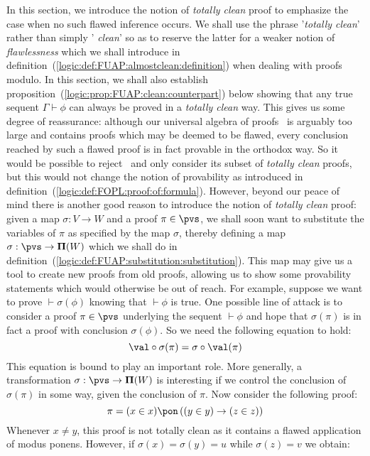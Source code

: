 In this section, we introduce the notion of {\em totally clean}
proof to emphasize the case when no such flawed inference occurs. We
shall use the phrase '{\em totally clean}' rather than simply '{\em
clean}' so as to reserve the latter for a weaker notion of {\em
flawlessness} which we shall introduce in
definition~(\ref{logic:def:FUAP:almostclean:definition}) when
dealing with proofs modulo. In this section, we shall also establish
proposition~(\ref{logic:prop:FUAP:clean:counterpart}) below showing
that any true sequent $\Gamma\vdash\phi$ can always be proved in a
{\em totally clean} way. This gives us some degree of reassurance:
although our universal algebra of proofs \pvs\ is arguably too large
and contains proofs which may be deemed to be flawed, every
conclusion reached by such a flawed proof is in fact provable in the
orthodox way. So it would be possible to reject \pvs\ and only
consider its subset of {\em totally clean} proofs, but this would
not change the notion of provability as introduced in
definition~(\ref{logic:def:FOPL:proof:of:formula}). However, beyond
our peace of mind there is another good reason to introduce the
notion of {\em totally clean} proof: given a map $\sigma:V\to W$ and
a proof $\pi\in\pvs$, we shall soon want to substitute the variables
of $\pi$ as specified by the map $\sigma$, thereby defining a map
$\sigma:\pvs\to{\bf\Pi}(W)$ which we shall do in
definition~(\ref{logic:def:FUAP:substitution:substitution}). This
map may give us a tool to create new proofs from old proofs,
allowing us to show some provability statements which would
otherwise be out of reach. For example, suppose we want to prove
$\vdash\sigma(\phi)$ knowing that $\vdash\phi$ is true. One possible
line of attack is to consider a proof $\pi\in\pvs$ underlying the
sequent $\vdash\phi$ and hope that $\sigma(\pi)$ is in fact a proof
with conclusion $\sigma(\phi)$. So we need the following equation to
hold:
    \begin{equation}\label{logic:eqn:FUAP:clean:clean:proof:intro:1}
    \val\circ\sigma(\pi)=\sigma\circ\val(\pi)
    \end{equation}
This equation is bound to play an important role. More generally, a
transformation $\sigma:\pvs\to{\bf\Pi}(W)$ is interesting if we
control the conclusion of $\sigma(\pi)$ in some way, given the
conclusion of $\pi$. Now consider the following proof:
    \[
    \pi=(x\in x)\pon\,((y\in y)\to(z\in z))
    \]
Whenever $x\neq y$, this proof is not totally clean as it contains a
flawed application of modus ponens. However, if
$\sigma(x)=\sigma(y)=u$ while $\sigma(z)=v$ we obtain:
